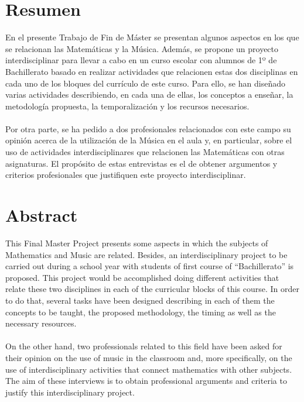 \documentclass[a4paper, openright, 11pt, titlepage]{report}
\theoremstyle{definition}\newtheorem{defin}[propo]{Definition}
\theoremstyle{definition}\newtheorem{obser}[propo]{Remark}
\theoremstyle{definition}\newtheorem{ejem}[propo]{Ejemplo}
\theoremstyle{definition}\newtheorem{algoritmo}[propo]{Algoritmo}
\begin{document}
\section*{Resumen} %
En el presente Trabajo de Fin de Máster se presentan algunos aspectos en los que se relacionan las Matemáticas y la Música. Además, se propone un proyecto interdisciplinar para llevar a cabo en un curso escolar con alumnos de 1º de Bachillerato basado en realizar actividades que relacionen estas dos disciplinas en cada uno de los bloques del currículo de este curso. Para ello, se han diseñado varias actividades describiendo, en cada una de ellas, los conceptos a enseñar, la metodología propuesta, la temporalización y los recursos necesarios.\\\\
Por otra parte, se ha pedido a dos profesionales relacionados con este campo su opinión acerca de la utilización de la Música en el aula y, en particular, sobre el uso de actividades interdisciplinares que relacionen las Matemáticas con otras asignaturas. El propósito de estas entrevistas es el de obtener  argumentos y criterios profesionales que justifiquen este proyecto 
interdisciplinar.
\section*{Abstract}
This Final Master Project presents some aspects in which the subjects of Mathematics and Music are related. Besides, an interdisciplinary project to be carried out during a school year with students of first course of “Bachillerato” is proposed. This project would be accomplished doing different activities that relate these two disciplines in each of the curricular blocks of this course. In order to do that, several tasks have been designed describing in each of them the concepts to be taught, the proposed methodology, the timing as well as the necessary resources.\\\\
On the other hand, two professionals related to this field have been asked for their opinion on the use of music in the classroom and, more specifically, on the use of interdisciplinary activities that connect mathematics with other subjects. The aim of these interviews is to obtain professional arguments and criteria to justify this interdisciplinary project.
\end{document}
